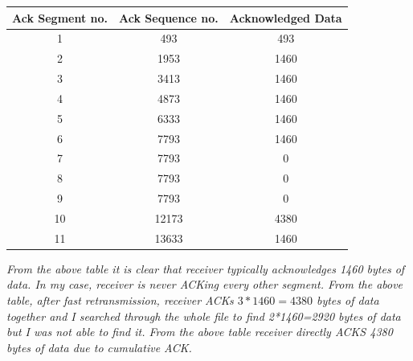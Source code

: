 \documentclass[11pt]{article}
\numberwithin{equation}{section}
\begin{document}
\begin{table}[H]
\begin{center}
    \begin{tabular}{|c|c|c|}
    \hline
    Ack Segment no. & Ack Sequence no. & Acknowledged Data\\ \hline
 
    1 & 493 & 493\\ \hline
    2 & 1953 & 1460  \\ \hline
    3 & 3413 & 1460\\ \hline
    4 & 4873 & 1460\\ \hline
    5 & 6333 & 1460 \\ \hline
    6 & 7793 & 1460\\ \hline
    7 & 7793 & 0\\ \hline  
    8 & 7793 & 0\\ \hline 
    9 & 7793 & 0\\ \hline
    10 & 12173 & 4380\\ \hline 
    11 & 13633 & 1460\\ \hline
    \end{tabular}
\end{center}
\end{table}

\textsl{ From the above table it is clear that receiver typically acknowledges 1460 bytes of data. In my case, receiver is never ACKing every other segment. From the above table, after fast retransmission, receiver ACKs $3*1460=4380$ bytes of data together and I searched through the whole file to find 2*1460=2920 bytes of data but I was not able to find it. From the above table receiver directly ACKS 4380 bytes of data due to cumulative ACK. }\newline
\end{document}
